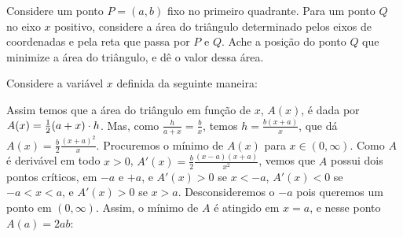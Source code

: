 \begin{exo}
 Considere um ponto $P=(a,b)$ fixo no primeiro quadrante. 
Para um ponto $Q$ no eixo $x$ positivo, considere a área do triângulo
determinado pelos eixos de coordenadas e pela reta que passa por $P$ e
$Q$. Ache a posição do ponto $Q$ que minimize a área do triângulo, e dê o valor
dessa área.
\begin{sol}
Considere a variável $x$ definida da seguinte maneira:
\begin{center}
\begin{bmlimage}\end{bmlimage}
\end{center}
Assim temos que a área do triângulo em função de $x$, $A(x)$, é dada por 
$A(x)=\frac{1}{2} (a+x)\cdot h$. Mas, como $\frac{h}{a+x}=\frac{b}{x}$, temos
$h=\frac{b(x+a)}{x}$, que dá
$A(x)=\frac{b}{2}\frac{(x+a)^2}{x}$.
Procuremos o mínimo de $A(x)$ para $x\in (0,\infty)$.
Como $A$ é derivável em todo $x>0$, $A'(x)=\frac{b}{2}\frac{(x-a)(x+a)}{x^2}$,
vemos que $A$ possui dois pontos críticos, em $-a$ e $+a$, e $A'(x)>0$ se
$x<-a$, $A'(x)<0$ se $-a<x<a$, e $A'(x)>0$ se $x>a$. Desconsideremos o $-a$ pois
queremos um ponto em $(0,\infty)$. Assim, o mínimo de $A$ é atingido em $x=a$,
e nesse ponto $A(a)=2ab$:
\begin{center}
\begin{bmlimage}\end{bmlimage}
\end{center}
\end{sol}
\end{exo}

